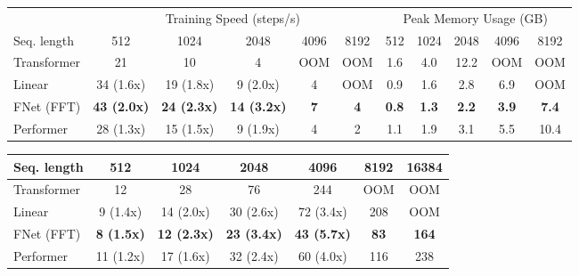 \documentclass[11pt]{article}
\begin{document}
\begin{table*}[tb]
\begin{subtable}[t]{\textwidth}
    \label{tab:lra_accuracy}
    \end{subtable}
    \begin{subtable}[t]{\textwidth}
    \centering
    \setlength{\tabcolsep}{4pt}
    \begin{tabular}{l | c c c c c | c c c c c}
        \hline
         & \multicolumn{5}{c|}{Training Speed (steps/s)} & \multicolumn{5}{c}{Peak Memory Usage (GB)} \\ 
         Seq. length & 512 & 1024 & 2048 & 4096 & 8192 & 512 & 1024 & 2048 & 4096 & 8192  \\ \hline \hline
         Transformer & 21 & 10 & 4 & OOM & OOM  & 1.6 & 4.0 & 12.2 & OOM & OOM \\
         Linear & 34 (1.6x) & 19 (1.8x) & 9 (2.0x) & 4 & OOM & 0.9 & 1.6 & 2.8 & 6.9 & OOM  \\
         FNet (FFT) &\textbf{43 (2.0x)} & \textbf{24 (2.3x)} & \textbf{14 (3.2x)} & \textbf{7} & \textbf{4} & \textbf{0.8} & \textbf{1.3} & \textbf{2.2} & \textbf{3.9} & \textbf{7.4}  \\
         Performer & 28 (1.3x) & 15 (1.5x) & 9 (1.9x) & 4 & 2 & 1.1 & 1.9 & 3.1 & 5.5 & 10.4 \\ \hline
    \end{tabular}
    \caption{GPU training for sequence lengths up to 8192. Only the fastest efficient Transformer, namely Performer, from \citet{tay2020long} is shown. Left: training speeds (in steps per second; larger is better), with speed-up multipliers relative to the Transformer given in parentheses. Right: peak memory usage (in GB; smaller is better).}
    \label{tab:lra_training_speed}
    \end{subtable}
    \begin{subtable}[t]{\textwidth}
    \centering
    \begin{tabular}{l | c c c c c c}
        \hline
         Seq. length & 512 & 1024 & 2048 & 4096 & 8192 & 16384 \\ \hline \hline
         Transformer & 12 & 28 & 76 & 244 & OOM & OOM \\
         Linear & 9 (1.4x) & 14 (2.0x) & 30 (2.6x) & 72 (3.4x) & 208 & OOM \\
         FNet (FFT) & \textbf{8 (1.5x)} & \textbf{12 (2.3x)} & \textbf{23 (3.4x)} & \textbf{43 (5.7x)} & \textbf{83} & \textbf{164} \\
         Performer & 11 (1.2x) & 17 (1.6x) & 32 (2.4x) & 60 (4.0x) & 116 & 238 \\ \hline
    \end{tabular}
    \caption{GPU inference speeds on the LRA Text classification task (in milliseconds per batch; smaller is better). Only the fastest efficient Transformer, Performer, from \citet{tay2020long} is shown. Speed up relative to the Transformer is given in parentheses.}
    \label{tab:lra_inference_speeds}
    \end{subtable}
\end{table*}
\end{document}
